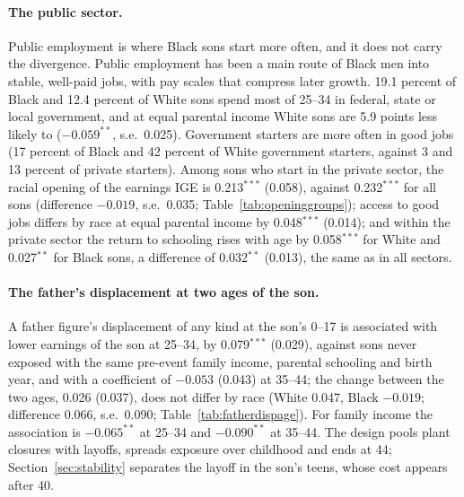 \paragraph{The public sector.} Public employment is where Black sons start more often, and it does not carry the
divergence. Public employment has been a main route of Black men into stable, well-paid jobs, with pay scales that
compress later growth. 19.1 percent of Black and 12.4 percent of White sons spend most of 25--34 in federal, state or
local government, and at equal parental income White sons are 5.9 points less likely to ($-0.059^{**}$, s.e.\ 0.025).
Government starters are more often in good jobs (17 percent of Black and 42 percent of White government starters,
against 3 and 13 percent of private starters). Among sons who start in the private sector, the racial opening of the
earnings IGE is 0.213$^{***}$ (0.058), against 0.232$^{***}$ for all sons (difference $-0.019$, s.e.\ 0.035;
Table~\ref{tab:openinggroups}); access to good jobs differs by race at equal parental income by 0.048$^{***}$ (0.014);
and within the private sector the return to schooling rises with age by 0.058$^{***}$ for White and 0.027$^{**}$ for
Black sons, a difference of 0.032$^{**}$ (0.013), the same as in all sectors.



\paragraph{The father's displacement at two ages of the son.} A father figure's displacement of any kind at the son's
0--17 is associated with lower earnings of the son at 25--34, by 0.079$^{***}$ (0.029), against sons never exposed with
the same pre-event family income, parental schooling and birth year, and with a coefficient of $-0.053$ (0.043) at
35--44; the change between the two ages, 0.026 (0.037), does not differ by race (White 0.047, Black $-0.019$; difference
0.066, s.e.\ 0.090; Table~\ref{tab:fatherdispage}). For family income the association is $-0.065^{**}$ at 25--34 and
$-0.090^{**}$ at 35--44. The design pools plant closures with layoffs, spreads exposure over childhood and ends at 44;
Section~\ref{sec:stability} separates the layoff in the son's teens, whose cost appears after 40.


